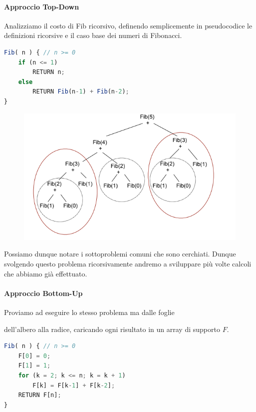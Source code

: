 \documentclass{article}
\begin{document}
\paragraph{Approccio Top-Down}

Analizziamo il costo di Fib ricorsivo, definendo semplicemente in pseudocodice le definizioni ricorsive e il caso base dei numeri di Fibonacci.

\begin{lstlisting}[language=JavaScript]
Fib( n ) { // n >= 0
    if (n <= 1)
        RETURN n;
    else
        RETURN Fib(n-1) + Fib(n-2);
}
\end{lstlisting}

\begin{figure}[htbp]
        \center
        \includegraphics[scale=0.6]{img/fibRicorsivo.png}
    \end{figure}

Possiamo dunque notare i sottoproblemi comuni che sono cerchiati. Dunque svolgendo questo problema ricorsivamente andremo a sviluppare più volte calcoli che abbiamo già effettuato.

\paragraph{Approccio Bottom-Up} Proviamo ad eseguire lo stesso problema ma dalle foglie 

dell'albero alla radice, caricando ogni risultato in un array di supporto $F$.

\begin{lstlisting}[language=JavaScript]
Fib( n ) { // n >= 0
    F[0] = 0;
    F[1] = 1;
    for (k = 2; k <= n; k = k + 1)
        F[k] = F[k-1] + F[k-2];
    RETURN F[n];
}
\end{lstlisting}
\end{document}

